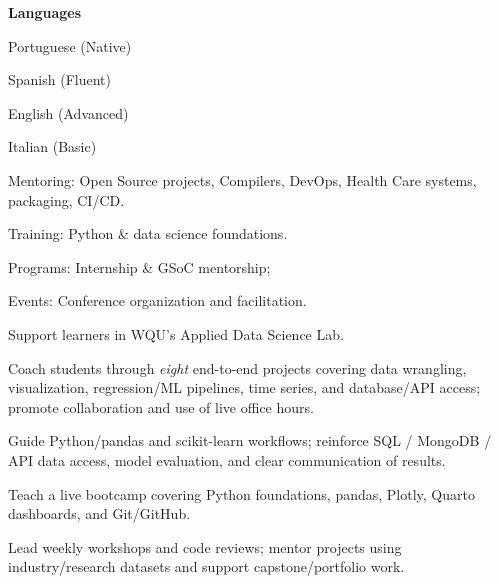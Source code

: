 \documentclass[10pt,a4paper]{article}
\begin{document}
\textbf{Languages}
\begin{tightitemize}
  \item Portuguese (Native)
  \item Spanish (Fluent)
  \item English (Advanced)
  \item Italian (Basic)
\end{tightitemize}

\begin{tightitemize}
  \item Mentoring: Open Source projects, Compilers, DevOps, Health Care systems, packaging, CI/CD.
  \item Training: Python \& data science foundations.
  \item Programs: Internship \& GSoC mentorship;
  \item Events: Conference organization and facilitation.
\end{tightitemize}

\normalsize

\switchcolumn



\begin{tightitemize}
  \item Support learners in WQU's Applied Data Science Lab.
  \item Coach students through \emph{eight} end-to-end projects covering data wrangling, visualization, regression/ML pipelines, time series, and database/API access; promote collaboration and use of live office hours.
  \item Guide Python/pandas and scikit-learn workflows; reinforce SQL / MongoDB / API data access, model evaluation, and clear communication of results.
\end{tightitemize}

\begin{tightitemize}
  \item Teach a live bootcamp covering Python foundations, pandas, Plotly, Quarto dashboards, and Git/GitHub.
  \item Lead weekly workshops and code reviews; mentor projects using industry/research datasets and support capstone/portfolio work.
\end{tightitemize}
\end{document}
